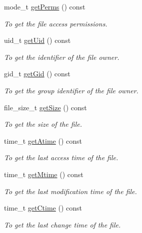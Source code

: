\begin{DoxyCompactItemize}
mode\_\-t \hyperlink{classFile_a3f9864e22e0eec72e1b4884c2779100f}{getPerms} () const 
\begin{DoxyCompactList}\small\item\em To get the file access permissions. \item\end{DoxyCompactList}\item 
uid\_\-t \hyperlink{classFile_a328160d52f616869a8994d6d0a85f8a6}{getUid} () const 
\begin{DoxyCompactList}\small\item\em To get the identifier of the file owner. \item\end{DoxyCompactList}\item 
gid\_\-t \hyperlink{classFile_ac608e5021f47b280aa00229e34f19d28}{getGid} () const 
\begin{DoxyCompactList}\small\item\em To get the group identifier of the file owner. \item\end{DoxyCompactList}\item 
file\_\-size\_\-t \hyperlink{classFile_a96ab72424a4cab2a671892bc2cd22982}{getSize} () const 
\begin{DoxyCompactList}\small\item\em To get the size of the file. \item\end{DoxyCompactList}\item 
time\_\-t \hyperlink{classFile_ae5b150a9c6382290f8a491514cd56477}{getAtime} () const 
\begin{DoxyCompactList}\small\item\em To get the last access time of the file. \item\end{DoxyCompactList}\item 
time\_\-t \hyperlink{classFile_a204776a581f17a1885da8558b1ee68ec}{getMtime} () const 
\begin{DoxyCompactList}\small\item\em To get the last modification time of the file. \item\end{DoxyCompactList}\item 
time\_\-t \hyperlink{classFile_a44da403de6230a3a06acb9adbb0d63c9}{getCtime} () const 
\begin{DoxyCompactList}\small\item\em To get the last change time of the file. \item\end{DoxyCompactList}\item 

\end{DoxyCompactItemize}
